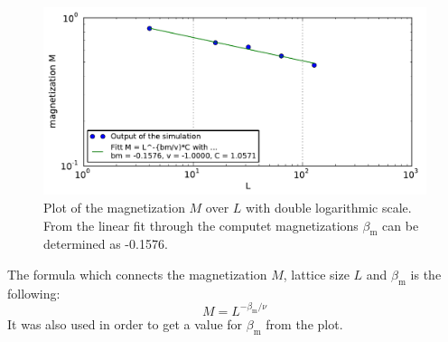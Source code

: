 \documentclass[12pt,a4paper]{scrartcl}
\begin{document}
\begin{figure}[H]
\includegraphics[width=16.0cm]{../plots/3beta_01.pdf}
\caption{Plot of the magnetization $M$ over $L$ with double logarithmic scale. From the linear fit through the computet magnetizations $\beta_\text{m}$ can be determined as -0.1576.}
\end{figure}

The formula which connects the magnetization $M$, lattice size $L$ and $\beta_\text{m}$ is the following:
\begin{equation}
	M = L^{-\beta_\text{m}/\nu}
\end{equation}
It was also used in order to get a value for $\beta_\text{m}$ from the plot.
\end{document}
